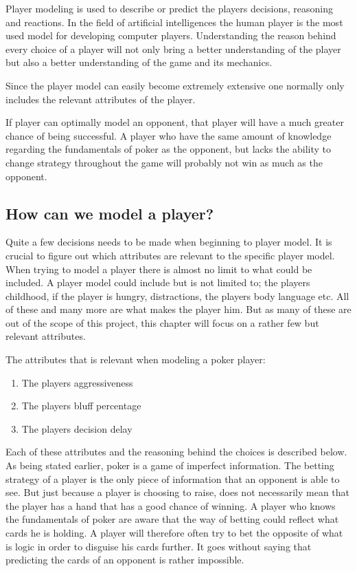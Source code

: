 Player modeling is used to describe or predict the players decisions, reasoning and reactions. In the field of artificial intelligences the human player is the most used model for developing computer players. Understanding the reason behind every choice of a player will not only bring a better understanding of the player but also a better understanding of the game and its mechanics.

Since the player model can easily become extremely extensive one normally only includes the relevant attributes of the player.

If player can optimally model an opponent, that player will have a much greater chance of being successful. A player who have the same amount of knowledge regarding the fundamentals of poker as the opponent, but lacks the ability to change strategy throughout the game will probably not win as much as the opponent.

\subsection{How can we model a player?}
Quite a few decisions needs to be made when beginning to player model. It is crucial to figure out which attributes are relevant to the specific player model. When trying to model a player there is almost no limit to what could be included. A player model could include but is not limited to; the players childhood, if the player is hungry, distractions, the players body language etc. All of these and many more are what makes the player him. But as many of these are out of the scope of this project, this chapter will focus on a rather few but relevant attributes. 

The attributes that is relevant when modeling a poker player:
\begin{enumerate}
  \item The players aggressiveness
  \item The players bluff percentage
  \item The players decision delay
\end{enumerate}

Each of these attributes and the reasoning behind the choices is described below.\\

As being stated earlier, poker is a game of imperfect information. The betting strategy of a player is the only piece of information that an opponent is able to see.
But just because a player is choosing to raise, does not necessarily mean that the player has a hand that has a good chance of winning.
A player who knows the fundamentals of poker are aware that the way of betting could reflect what cards he is holding. A player will therefore often try to bet the opposite of what is logic in order to disguise his cards further.
It goes without saying that predicting the cards of an opponent is rather impossible. \\

